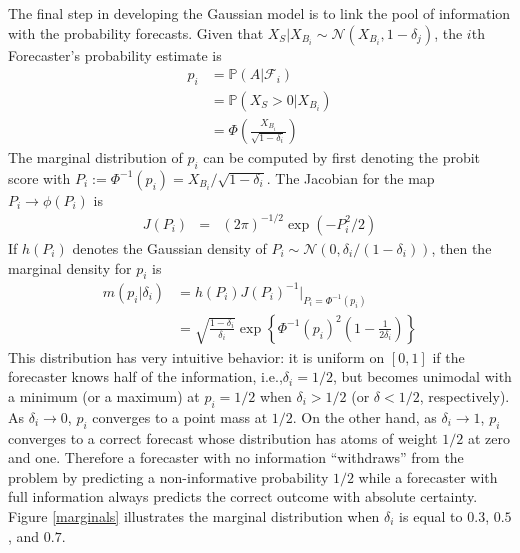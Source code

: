 \documentclass[11pt]{article}
\renewcommand{\P}{\mathbb{P}}
\theoremstyle{definition}
\theoremstyle{definition}
\def\one{{\bf 1}}
\def\P{{\mathbb P}}
\begin{document}
The final step in developing the Gaussian model is
to link the pool of information with the probability forecasts. Given that $X_S | X_{B_i} \sim \mathcal{N}\left(X_{B_i}, 1-\delta_j\right)$, the $i$th Forecaster's probability estimate is
\begin{align}
p_i &= \P\left(A | \mathcal{F}_{i}\right) \nonumber \\
 &= \P\left(X_S > 0 | X_{B_i}\right) \nonumber \\
 &= \Phi\left( \frac{X_{B_i}}{\sqrt{1-\delta_i}}\right) \label{indFore}
\end{align}
The marginal distribution of $p_i$ can be computed by first denoting the probit score with $P_{i} := \Phi^{-1}(p_i) = X_{B_i}/\sqrt{1-\delta_i}$. The Jacobian for the map $P_{i} \to \phi(P_i)$ is
\begin{eqnarray*}
J(P_i) &=& (2\pi)^{-1/2} \exp \left( - P_i^2/2   \right) 
\end{eqnarray*}
If $h(P_i)$ denotes the Gaussian density of $P_i \sim \mathcal{N}\left(0, \delta_i / (1-\delta_i)\right)$, then
the marginal density for $p_i$ is
\begin{align*}
 m\left(p_i | \delta_i \right) &= h(P_i) J(P_i)^{-1} \bigg|_{P_i = \Phi^{-1}(p_i)}\\
&= \sqrt{\frac{1-\delta_i}{\delta_i}} \exp 
   \left\{ \Phi^{-1}(p_i)^2 \left(1-\frac{1}{2 \delta_i} \right) \right\} 
\end{align*}
This distribution has very intuitive behavior: it is uniform on $[0,1]$ if the forecaster knows half of the
information, i.e.,$\delta_i = 1/2$, but becomes 
unimodal with a minimum (or a maximum) at $p_i = 1/2$ when $\delta_i > 1/2$ (or $\delta < 1/2$, respectively).  As $\delta_i \to 0$, $p_i$ converges to a point mass at $1/2$. On the other hand, as $\delta_i \to 1$, $p_i$ converges to
a correct forecast whose distribution has atoms of weight $1/2$ at
zero and one. Therefore a forecaster with no information ``withdraws'' from the problem by predicting a non-informative probability $1/2$ while a forecaster with full information always predicts the correct outcome with absolute certainty. Figure \ref{marginals} illustrates the marginal
distribution when $\delta_i$ is equal to $0.3$, $0.5$, and $0.7$.
\end{document}
